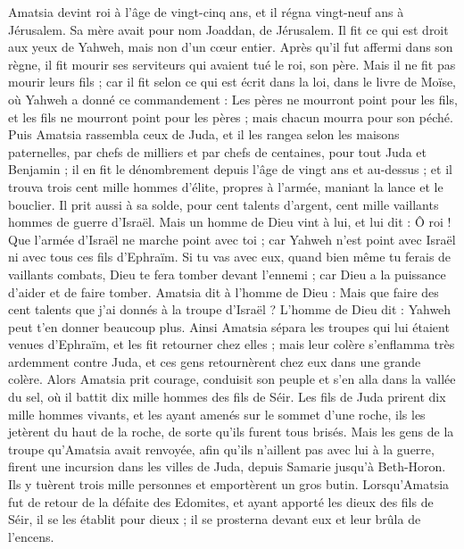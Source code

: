 \begin{multicols}{2}
\VerseOne{}Amatsia devint roi à l'âge de vingt-cinq ans, et il régna vingt-neuf ans à Jérusalem. Sa mère avait pour nom Joaddan, de Jérusalem.
Il fit ce qui est droit aux yeux de Yahweh, mais non d'un cœur entier.
Après qu'il fut affermi dans son règne, il fit mourir ses serviteurs qui avaient tué le roi, son père.
Mais il ne fit pas mourir leurs fils ; car il fit selon ce qui est écrit dans la loi, dans le livre de Moïse, où Yahweh a donné ce commandement : Les pères ne mourront point pour les fils, et les fils ne mourront point pour les pères ; mais chacun mourra pour son péché.
Puis Amatsia rassembla ceux de Juda, et il les rangea selon les maisons paternelles, par chefs de milliers et par chefs de centaines, pour tout Juda et Benjamin ; il en fit le dénombrement depuis l'âge de vingt ans et au-dessus ; et il trouva trois cent mille hommes d'élite, propres à l'armée, maniant la lance et le bouclier.
Il prit aussi à sa solde, pour cent talents d'argent, cent mille vaillants hommes de guerre d'Israël.
Mais un homme de Dieu vint à lui, et lui dit : Ô roi ! Que l'armée d'Israël ne marche point avec toi ; car Yahweh n'est point avec Israël ni avec tous ces fils d'Ephraïm.
Si tu vas avec eux, quand bien même tu ferais de vaillants combats, Dieu te fera tomber devant l'ennemi ; car Dieu a la puissance d'aider et de faire tomber.
Amatsia dit à l'homme de Dieu : Mais que faire des cent talents que j'ai donnés à la troupe d'Israël ? L'homme de Dieu dit : Yahweh peut t'en donner beaucoup plus.
Ainsi Amatsia sépara les troupes qui lui étaient venues d'Ephraïm, et les fit retourner chez elles ; mais leur colère s'enflamma très ardemment contre Juda, et ces gens retournèrent chez eux dans une grande colère.
Alors Amatsia prit courage, conduisit son peuple et s'en alla dans la vallée du sel, où il battit dix mille hommes des fils de Séir.
Les fils de Juda prirent dix mille hommes vivants, et les ayant amenés sur le sommet d'une roche, ils les jetèrent du haut de la roche, de sorte qu'ils furent tous brisés.
Mais les gens de la troupe qu'Amatsia avait renvoyée, afin qu'ils n'aillent pas avec lui à la guerre, firent une incursion dans les villes de Juda, depuis Samarie jusqu'à Beth-Horon. Ils y tuèrent trois mille personnes et emportèrent un gros butin.
Lorsqu'Amatsia fut de retour de la défaite des Edomites, et ayant apporté les dieux des fils de Séir, il se les établit pour dieux ; il se prosterna devant eux et leur brûla de l'encens.

\end{multicols}
